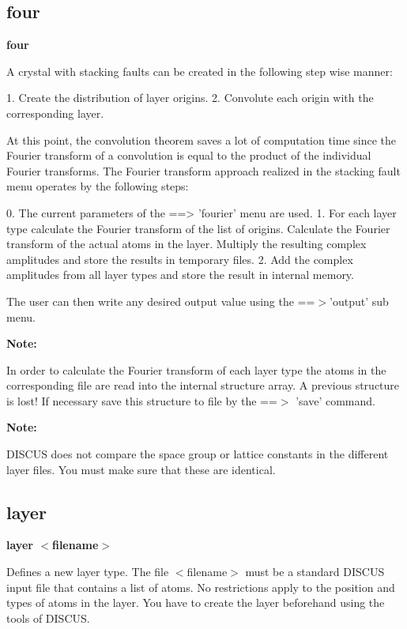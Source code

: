 \subsection*{four}
{\bf four \par }
\par
\vspace{3pt}
A crystal with stacking faults can be created in the following step wise 
manner: 
\par
\begin{MacVerbatim}
  1. Create the distribution of layer origins.
  2. Convolute each origin with the corresponding layer.
\end{MacVerbatim}
At this point, the convolution theorem saves a lot of computation time 
since the Fourier transform of a convolution is equal to the product 
of the individual Fourier transforms. The Fourier transform approach 
realized in the stacking fault menu operates by the following steps: 
\par
\begin{MacVerbatim}
  0. The current parameters of the ==> 'fourier' menu are used.
  1. For each layer type calculate the Fourier transform of the
     list of origins.
     Calculate the Fourier transform of the actual atoms in the layer.
     Multiply the resulting complex amplitudes and store the results
     in temporary files.
  2. Add the complex amplitudes from all layer types and store the
     result in internal memory.
\end{MacVerbatim}
The user can then write any desired output value using the ==$> $'output' 
sub menu. 
\par
{\bf Note: \par }
\vspace{3pt}
In order to calculate the Fourier transform of each layer type the atoms 
in the corresponding file are read into the internal structure array. 
A previous structure is lost! If necessary save this structure to file 
by the ==$> $ 'save' command. 
\par
{\bf Note: \par }
\vspace{3pt}
DISCUS does not compare the space group or lattice constants in the 
different layer files. You must make sure that these are identical. 
\subsection*{layer}
{\bf layer $ <$filename$> $ \par }
\par
\vspace{3pt}
Defines a new layer type. 
The file $ <$filename$> $ must be a standard DISCUS input file that contains 
a list of atoms. No restrictions apply to the position and types of 
atoms in the layer. You have to create the layer beforehand using the 
tools of DISCUS. 

